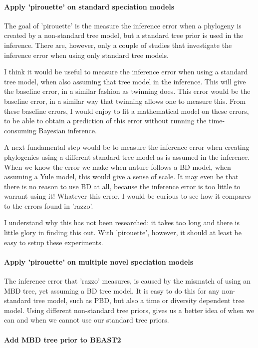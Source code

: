 \paragraph{Apply 'pirouette' on standard speciation models} 

The goal of 'pirouette' is the measure the inference error
when a phylogeny is created by a non-standard tree model,
but a standard tree prior is used in the inference. There are,
however, only a couple of studies that investigate the
inference error when using only standard tree models.

I think it would be useful to measure the inference
error when using a standard tree model, when also
assuming that tree model in the inference. This will give the
baseline error, in a similar fashion as twinning does.
This error would be the baseline error, in a similar way that
twinning allows one to measure this. From these baseline errors,
I would enjoy to fit a mathematical model on these errors,
to be able to obtain a prediction of this error without running
the time-consuming Bayesian inference.

A next fundamental step would be to measure the inference
error when creating phylogenies using a different standard tree model
as is assumed in the inference. 
When we know the error we make when nature follows a BD model,
when assuming a Yule model, this would give a sense of scale.
It may even be that there is no reason to use BD at all,
because the inference error is too little to warrant using it!
Whatever this error, I would be curious to see how it compares
to the errors found in 'razzo'. 

I understand why this has not been researched: it takes too long
and there is little glory in finding this out. With 'pirouette', however,
it should at least be easy to setup these experiments.

\paragraph{Apply 'pirouette' on multiple novel speciation models} 

The inference error that 'razzo' measures, is caused by the
mismatch of using an MBD tree, yet assuming a BD tree model.
It is easy to do this for any non-standard tree model, such as
PBD, but also a time or diversity dependent tree model. Using
different non-standard tree priors, gives us a better idea of when we can
and when we cannot use our standard tree priors.

\paragraph{Add MBD tree prior to BEAST2}

